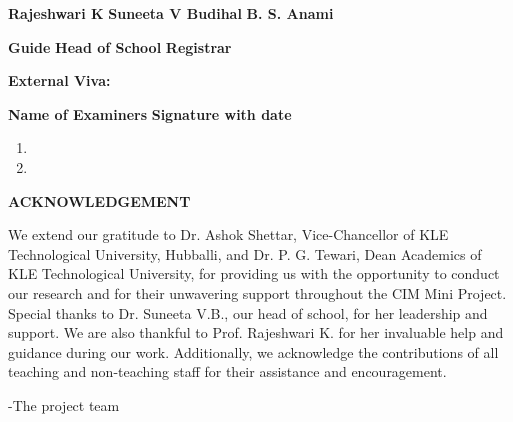 \documentclass[12 pt]{report}
\begin{document}
\vspace{2cm}
\begin{small} \textbf{Rajeshwari K} \hspace{2cm} \textbf{ Suneeta V Budihal} \hspace{2.8cm} \textbf{ B. S. Anami} \linebreak
\end{small}
\vspace{1cm}
\hspace{1cm} \small{\textbf{Guide} \hspace{4cm} \textbf{Head of School} \hspace{4cm}  \textbf{Registrar}}


\vspace{0.8cm}

\begin{flushleft}
  \textbf{External Viva: \\}
\end{flushleft}
\textbf{Name of Examiners} \hspace{8cm} \textbf{Signature with date}
\begin{enumerate}
  \item
  \item
\end{enumerate}

\newpage
\begin{center}
  \begin{Large}
    \textbf{ACKNOWLEDGEMENT}
  \end{Large}
\end{center}
We extend our gratitude to Dr. Ashok Shettar, Vice-Chancellor of KLE Technological University, Hubballi, and Dr. P. G. Tewari, Dean Academics of KLE Technological University, for providing us with the opportunity to conduct our research and for their unwavering support throughout the CIM Mini Project. Special thanks to Dr. Suneeta V.B., our head of school, for her leadership and support. We are also thankful to Prof. Rajeshwari K. for her invaluable help and guidance during our work. Additionally, we acknowledge the contributions of all teaching and non-teaching staff for their assistance and encouragement.

\flushright
-The project team
\flushleft
\end{document}
